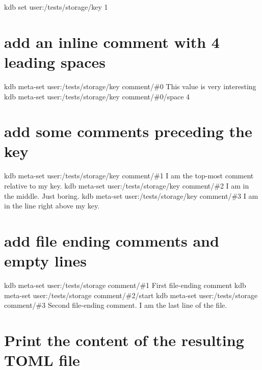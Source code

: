 kdb set \textquotesingle{}user\+:/tests/storage/key\textquotesingle{} \textquotesingle{}1\textquotesingle{}\hypertarget{autotoc_md642_autotoc_md729}{}\section{add an inline comment with 4 leading spaces}\label{autotoc_md642_autotoc_md729}
kdb meta-\/set \textquotesingle{}user\+:/tests/storage/key\textquotesingle{} \textquotesingle{}comment/\#0\textquotesingle{} \textquotesingle{} This value is very interesting\textquotesingle{} kdb meta-\/set \textquotesingle{}user\+:/tests/storage/key\textquotesingle{} \textquotesingle{}comment/\#0/space\textquotesingle{} \textquotesingle{}4\textquotesingle{}\hypertarget{autotoc_md642_autotoc_md730}{}\section{add some comments preceding the key}\label{autotoc_md642_autotoc_md730}
kdb meta-\/set \textquotesingle{}user\+:/tests/storage/key\textquotesingle{} \textquotesingle{}comment/\#1\textquotesingle{} \textquotesingle{} I am the top-\/most comment relative to my key.\textquotesingle{} kdb meta-\/set \textquotesingle{}user\+:/tests/storage/key\textquotesingle{} \textquotesingle{}comment/\#2\textquotesingle{} \textquotesingle{} I am in the middle. Just boring.\textquotesingle{} kdb meta-\/set \textquotesingle{}user\+:/tests/storage/key\textquotesingle{} \textquotesingle{}comment/\#3\textquotesingle{} \textquotesingle{} I am in the line right above my key.\textquotesingle{}\hypertarget{autotoc_md642_autotoc_md731}{}\section{add file ending comments and empty lines}\label{autotoc_md642_autotoc_md731}
kdb meta-\/set \textquotesingle{}user\+:/tests/storage\textquotesingle{} \textquotesingle{}comment/\#1\textquotesingle{} \textquotesingle{} First file-\/ending comment\textquotesingle{} kdb meta-\/set \textquotesingle{}user\+:/tests/storage\textquotesingle{} \textquotesingle{}comment/\#2/start\textquotesingle{} \textquotesingle{}\textquotesingle{} kdb meta-\/set \textquotesingle{}user\+:/tests/storage\textquotesingle{} \textquotesingle{}comment/\#3\textquotesingle{} \textquotesingle{} Second file-\/ending comment. I am the last line of the file.\textquotesingle{}\hypertarget{autotoc_md642_autotoc_md732}{}\section{Print the content of the resulting T\+O\+M\+L file}\label{autotoc_md642_autotoc_md732}
